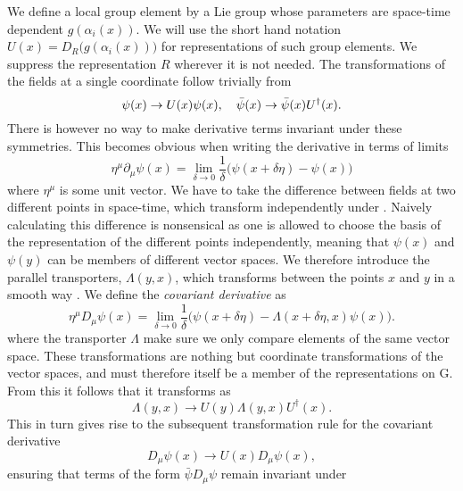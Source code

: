 We define a local group element by a Lie group whose parameters are space-time
dependent $g(\alpha_i(x))$. We will use the short hand notation $U(x) =
D_R\big(g(\alpha_i(x))\big)$ for representations of such group elements. We
suppress the representation $R$ wherever it is not needed. The transformations
of the fields at a single coordinate follow trivially from
%
\begin{equation} \label{eq-local_trafo}
  \psi(x) \to U(x) \psi(x), \hskip1em \bar{\psi}(x) \to \bar{\psi}(x)
  U^{\dagger}(x).
\end{equation}
%
There is however no way to make derivative terms invariant under these
symmetries. This becomes obvious when writing the derivative in terms of limits
%
\begin{equation}
  \eta^{\mu} \partial_{\mu} \psi(x) = \lim_{\delta \to 0} \frac{1}{\delta} \big(
    \psi(x + \delta\eta) - \psi(x) \big)
\end{equation}
%
where $\eta^{\mu}$ is some unit vector. We have to take the difference between
fields at two different points in space-time, which transform independently
under . Naively calculating this difference is
nonsensical as one is allowed to choose the basis of the representation of the
different points independently, meaning that $\psi(x)$ and $\psi(y)$ can be
members of different vector spaces. We therefore introduce the parallel
transporters, $\Lambda(y,x)$, which transforms between the points $x$ and $y$ in
a smooth way \citep{Wu:1975es}. We define the \emph{covariant derivative} as
%
\begin{equation}
  \eta^{\mu} D_{\mu} \psi(x) = \lim_{\delta \to 0} \frac{1}{\delta} \big(
    \psi(x + \delta\eta) - \Lambda(x+\delta\eta,x)\psi(x) \big).
\end{equation}
%
where the transporter $\Lambda$ make sure we only compare elements of the same
vector space. These transformations are nothing but coordinate transformations
of the vector spaces, and must therefore itself be a member of the
representations on G. From this it follows that it transforms as
%
\begin{equation}
  \Lambda(y,x) \to U(y) \Lambda(y,x) U^{\dagger}(x).
\end{equation}
%
This in turn gives rise to the subsequent transformation rule for the covariant
derivative
%
\begin{equation}
  D_{\mu}\psi(x) \to U(x) D_{\mu} \psi(x),
\end{equation}
%
ensuring that terms of the form $\bar{\psi} D_{\mu} \psi$ remain invariant under

